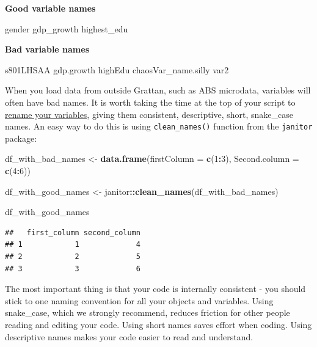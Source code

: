 \documentclass[
]{book}
\newenvironment{Shaded}{\begin{snugshade}}{\end{snugshade}}
\newcommand{\DataTypeTok}[1]{\textcolor[rgb]{0.13,0.29,0.53}{#1}}
\newcommand{\DecValTok}[1]{\textcolor[rgb]{0.00,0.00,0.81}{#1}}
\newcommand{\KeywordTok}[1]{\textcolor[rgb]{0.13,0.29,0.53}{\textbf{#1}}}
\newcommand{\NormalTok}[1]{#1}
\newcommand{\OperatorTok}[1]{\textcolor[rgb]{0.81,0.36,0.00}{\textbf{#1}}}
\newcommand{\StringTok}[1]{\textcolor[rgb]{0.31,0.60,0.02}{#1}}
\begin{document}
\textbf{Good variable names}

\begin{Shaded}
\begin{Highlighting}[]
\NormalTok{gender}
\NormalTok{gdp\_growth}
\NormalTok{highest\_edu}
\end{Highlighting}
\end{Shaded}

\textbf{Bad variable names}

\begin{Shaded}
\begin{Highlighting}[]
\NormalTok{s801LHSAA}
\NormalTok{gdp.growth}
\NormalTok{highEdu}
\NormalTok{chaosVar\_name.silly}
\NormalTok{var2}
\end{Highlighting}
\end{Shaded}

When you load data from outside Grattan, such as ABS microdata, variables will often have bad names. It is worth taking the time at the top of your script to \href{https://dplyr.tidyverse.org/reference/select.html}{rename your variables}, giving them consistent, descriptive, short, snake\_case names. An easy way to do this is using \texttt{clean\_names()} function from the \texttt{janitor} package:

\begin{Shaded}
\begin{Highlighting}[]
\NormalTok{df\_with\_bad\_names \textless{}{-}}\StringTok{ }\KeywordTok{data.frame}\NormalTok{(}\DataTypeTok{firstColumn =} \KeywordTok{c}\NormalTok{(}\DecValTok{1}\OperatorTok{:}\DecValTok{3}\NormalTok{),}
                                \DataTypeTok{Second.column =} \KeywordTok{c}\NormalTok{(}\DecValTok{4}\OperatorTok{:}\DecValTok{6}\NormalTok{))}

\NormalTok{df\_with\_good\_names \textless{}{-}}\StringTok{ }\NormalTok{janitor}\OperatorTok{::}\KeywordTok{clean\_names}\NormalTok{(df\_with\_bad\_names)}

\NormalTok{df\_with\_good\_names}
\end{Highlighting}
\end{Shaded}

\begin{verbatim}
##   first_column second_column
## 1            1             4
## 2            2             5
## 3            3             6
\end{verbatim}

The most important thing is that your code is internally consistent - you should stick to one naming convention for all your objects and variables. Using snake\_case, which we strongly recommend, reduces friction for other people reading and editing your code. Using short names saves effort when coding. Using descriptive names makes your code easier to read and understand.
\end{document}
